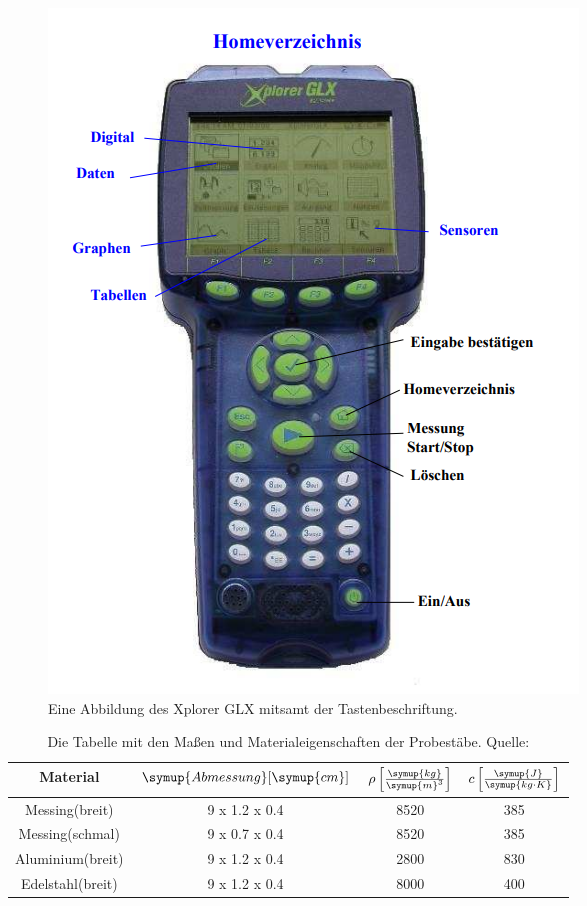 \begin{figure}[H]
    \centering
    \includegraphics[scale=0.6]{content/GLX.png}
    \caption{Eine Abbildung des Xplorer GLX mitsamt der Tastenbeschriftung. \cite{sample}}
    \label{fig:GLX}
\end{figure}
\begin{table}[H]
    \centering
    \caption{Die Tabelle mit den Maßen und Materialeigenschaften der Probestäbe. Quelle:\cite{sample}}
    \label{fig:Masse}
    \begin{tabular}{cccc}
        \toprule
        Material&
        {$\symup{Abmessung}[\symup{cm}]$} &
        {$\rho \left[\frac{\symup{kg}}{\symup{m}^3}\right]$} &
        {$c \left[\frac{\symup{J}}{\symup{kg\cdot K}}\right]$} \\
        \midrule
        Messing(breit) & 9 x 1.2 x 0.4 & 8520 & 385 \\
        Messing(schmal) & 9 x 0.7 x 0.4 & 8520 & 385 \\
        Aluminium(breit) & 9 x 1.2 x 0.4 & 2800 & 830 \\
        Edelstahl(breit) & 9 x 1.2 x 0.4 & 8000 & 400 \\
        \bottomrule
    \end{tabular}
\end{table}
